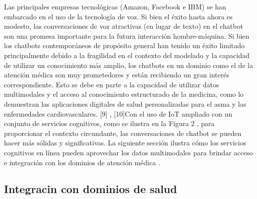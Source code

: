 Las principales empresas tecnológicas (Amazon, Facebook e IBM) se han embarcado en el uso de la tecnología de voz. Si bien el éxito hasta ahora es modesto, las conversaciones de voz atractivas (en lugar de texto) en el chatbot son una promesa importante para la futura interacción hombre-máquina. Si bien los chatbots contemporáneos de propósito general han tenido un éxito limitado principalmente debido a la fragilidad en el contexto del modelado y la capacidad de utilizar un conocimiento más amplio, los chatbots en un dominio como el de la atención médica son muy prometedores y están recibiendo un gran interés correspondiente. Esto se debe en parte a la capacidad de utilizar datos multimodales y el acceso al conocimiento estructurado de la medicina, como lo demuestran las aplicaciones digitales de salud personalizadas para el asma y las enfermedades cardiovasculares. [9] , [10]Con el uso de IoT ampliado con un conjunto de servicios cognitivos, como se ilustra en la Figura 2 , para proporcionar el contexto circundante, las conversaciones de chatbot se pueden hacer más sólidas y significativas. La siguiente sección ilustra cómo los servicios cognitivos en línea pueden aprovechar los datos multimodales para brindar acceso e integración con los dominios de atención médica \cite{Majarres}.

\subsection{Integracin con dominios de salud}

